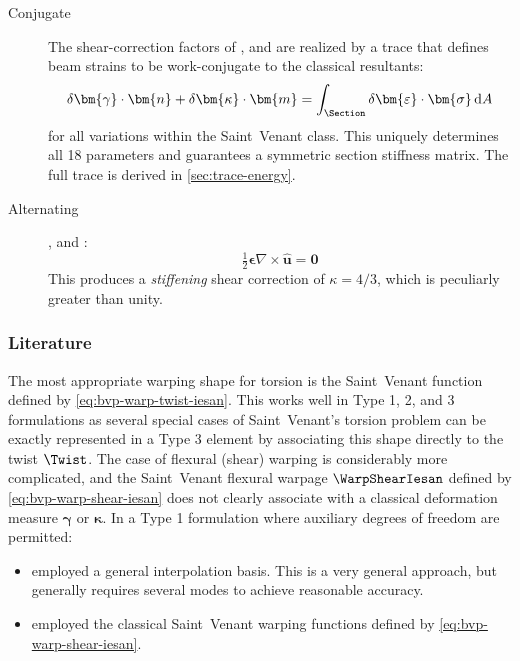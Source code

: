 \begin{description}
    \item[Conjugate] The shear-correction factors of \cite{krenk1985pretwist}, \cite{renton1991generalized} and \cite{romano1992shear} are realized by a trace that defines beam strains to be 
    work-conjugate to the classical resultants:
    \begin{equation}
    \delta\bm{\gamma} \cdot \bm{n} + \delta\bm{\kappa} \cdot \bm{m} 
    = \int_\Section \delta\bm{\varepsilon} \cdot \bm{\sigma} \, \mathrm{d}A
    \label{eq:def-trace-conjugate}
    \end{equation}
    for all variations within the Saint~Venant class.
    This uniquely determines all 18 
    parameters and guarantees a symmetric section stiffness matrix. The full trace is derived in \cref{sec:trace-energy}. 
    \item[Alternating]
    \cite[Eq. (7.4.52)]{slaughter2013linearized}, and \cite{reddy2002energy}:
    \[
    \tfrac12 \bm{\epsilon}\nabla\times\hat{\bm u}= \mathbf{0}
    \]
    This produces a \emph{stiffening} shear correction of \(\kappa = 4/3\), which is peculiarly greater than unity. 
\end{description}

\subsubsection{Literature}
The most appropriate warping shape for torsion is the Saint~Venant function defined by \eqref{eq:bvp-warp-twist-iesan}. 
This works well in Type 1, 2, and 3 formulations as several special cases of Saint~Venant's torsion problem can be exactly represented in a Type 3 element by associating this shape directly to the twist \(\Twist\).
The case of flexural (shear) warping is considerably more complicated, and the Saint~Venant flexural warpage \(\WarpShearIesan\) defined by \eqref{eq:bvp-warp-shear-iesan} does not clearly associate with a classical deformation measure \(\bm{\gamma}\) or \(\bm{\kappa}\). 
In a Type 1 formulation where auxiliary degrees of freedom are permitted:
\begin{itemize}
    \item \cite{lecorvec2012nonlinear} employed a general interpolation basis. This is a very general approach, but generally requires several modes to achieve reasonable accuracy.
    \item  \cite{klinkel2003anisotropic} employed the classical Saint~Venant warping functions defined by \eqref{eq:bvp-warp-shear-iesan}. 
\end{itemize}


